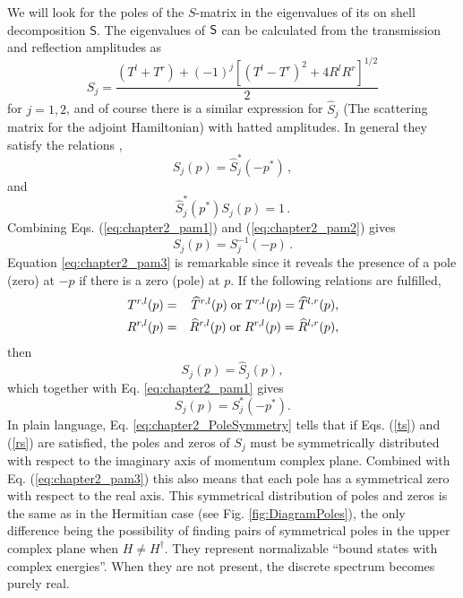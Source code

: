 We will look for the poles of the $S$-matrix in the eigenvalues of its on shell decomposition $\mathsf{S}$. The eigenvalues of $\sf{S}$ can be calculated from the transmission and reflection amplitudes as
%
\begin{equation}
	S_j=\frac{(T^l+T^r)+(-1)^j[(T^l-T^r)^2+4R^lR^r]^{1/2}}{2}
	\label{eq:chapter2_SEigenvalues}
\end{equation}
%
for $j=1,2$, and of course there is a similar expression for $\widehat{S}_j$ (The scattering matrix for the adjoint Hamiltonian) with hatted amplitudes.
In general they satisfy the relations \cite{Muga2004},
%
\begin{equation}\label{eq:chapter2_pam1}
	S_j(p)=\widehat{S}_j^*(-p^*)\,,
\end{equation}
%
and
%
\begin{equation}\label{eq:chapter2_pam2}
	\widehat{S}_j^*(p^*)S_j(p)=1\,.
\end{equation}
%
Combining Eqs. (\ref{eq:chapter2_pam1}) and (\ref{eq:chapter2_pam2}) gives
%
\begin{equation}\label{eq:chapter2_pam3}
	S_j(p)=S^{-1}_j(-p)\,.
\end{equation}
%
Equation \eqref{eq:chapter2_pam3} is remarkable since it reveals the presence of a pole (zero) at $-p$ if there is a zero (pole) at $p$.
%
If the following relations are fulfilled,
%
\begin{eqnarray}
	T^{r,l}(p)&=&\widehat{T}^{r,l}(p)\; {\rm or}\; T^{r,l}(p)=\widehat{T}^{l,r}(p),
	\label{ts}
	\\
	R^{r,l}(p)&=&\widehat{R}^{r,l}(p)\; {\rm or}\; R^{r,l}(p)=\widehat{R}^{l,r}(p),
	\label{rs}
\end{eqnarray}
%
then
%
\begin{equation}
	S_j(p)=\widehat{S}_j(p),
\end{equation}
%
which together with Eq. \eqref{eq:chapter2_pam1} gives
%
\begin{equation}
	S_j(p)=S_j^*(-p^*).
	\label{eq:chapter2_PoleSymmetry}
\end{equation}
In plain language, Eq. \eqref{eq:chapter2_PoleSymmetry} tells that if Eqs. (\ref{ts}) and (\ref{rs}) are satisfied,  the poles and zeros of $S_j$ must be symmetrically distributed with respect to the imaginary axis of momentum complex plane. Combined with Eq. (\ref{eq:chapter2_pam3})
this also means that each pole has a symmetrical zero with respect to the real axis. This symmetrical distribution of poles and zeros is the same as in the Hermitian case (see Fig. \ref{fig:DiagramPoles}),
the only difference being the possibility
of finding pairs of symmetrical poles in the upper complex plane when $H\neq H^\dagger$. They represent normalizable ``bound states
with complex energies''. When they  are not present, the discrete spectrum becomes purely real.

